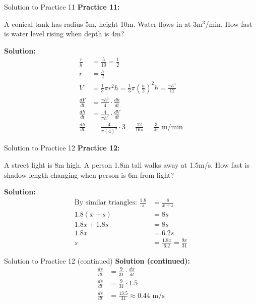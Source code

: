 \documentclass[aspectratio=169]{beamer}
\begin{document}
\begin{frame}{Solution to Practice 11}
\textbf{Practice 11:}

A conical tank has radius 5m, height 10m. Water flows in at 3m$^3$/min. How fast is water level rising when depth is 4m?

\textbf{Solution:}
\[
\begin{aligned}
  \frac{r}{h} &= \frac{5}{10} = \frac{1}{2} \\
  r &= \frac{h}{2} \\
  V &= \frac{1}{3}\pi r^2 h = \frac{1}{3}\pi(\frac{h}{2})^2 h = \frac{\pi h^3}{12} \\
  \frac{dV}{dt} &= \frac{\pi h^2}{4} \cdot \frac{dh}{dt} \\
  \frac{dh}{dt} &= \frac{4}{\pi h^2} \cdot \frac{dV}{dt} \\
  \frac{dh}{dt} &= \frac{4}{\pi(4)^2} \cdot 3 = \frac{12}{16\pi} = \frac{3}{4\pi} \text{ m/min}
\end{aligned}
\]
\end{frame}

\begin{frame}{Solution to Practice 12}
\textbf{Practice 12:}

A street light is 8m high. A person 1.8m tall walks away at 1.5m/s. How fast is shadow length changing when person is 6m from light?

\textbf{Solution:}
\[
\begin{aligned}
  \text{By similar triangles: } \frac{1.8}{s} &= \frac{8}{x + s} \\
  1.8(x + s) &= 8s \\
  1.8x + 1.8s &= 8s \\
  1.8x &= 6.2s \\
  s &= \frac{1.8x}{6.2} = \frac{9x}{31}
\end{aligned}
\]
\end{frame}

\begin{frame}{Solution to Practice 12 (continued)}
\textbf{Solution (continued):}
\[
\begin{aligned}
  \frac{ds}{dt} &= \frac{9}{31} \cdot \frac{dx}{dt} \\
  \frac{ds}{dt} &= \frac{9}{31} \cdot 1.5 \\
  \frac{ds}{dt} &= \frac{13.5}{31} \approx 0.44 \text{ m/s}
\end{aligned}
\]
\end{frame}
\end{document}
